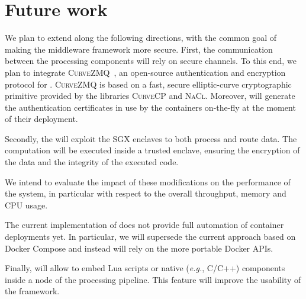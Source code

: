 \section{Future work}
\label{sec:future}
We plan to extend \SYS along the following directions, with the common goal of making the middleware framework more secure.
First, the communication between the processing components will rely on secure channels.
To this end, we plan to integrate \textsc{CurveZMQ}~\cite{zmq:curvezmq}, an open-source authentication and encryption protocol for \zmq.
\textsc{CurveZMQ} is based on a fast, secure elliptic-curve cryptographic primitive provided by the libraries \textsc{CurveCP}\cite{zmq:curvecp} and \textsc{NaCl}\cite{zmq:nacl}.
Moreover, \SYS will generate the authentication certificates in use by the containers on-the-fly at the moment of their deployment.

Secondly, the \SYS will exploit the SGX enclaves to both process and route data.
The computation will be executed inside a trusted enclave, ensuring the encryption of the data and the integrity of the executed code.

We intend to evaluate the impact of these modifications on the performance of the system, in particular with respect to the overall throughput, memory and CPU usage.

The current implementation of \SYS does not provide full automation of container deployments yet.
In particular, we will supersede the current approach based on Docker Compose and instead will rely on the more portable Docker APIs.

Finally, \SYS will allow to embed Lua scripts or native (\emph{e.g.}, C/C++) components inside a node of the processing pipeline.
This feature will improve the usability of the framework.
